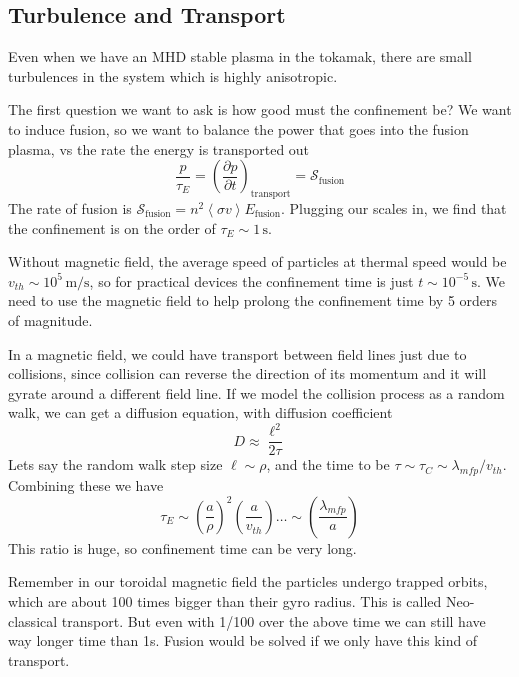 \documentclass[letterpaper, 11pt]{article}
\numberwithin{equation}{section}
\numberwithin{figure}{section}
\begin{document}
\subsection{Turbulence and Transport}

Even when we have an MHD stable plasma in the tokamak, there are small
turbulences in the system which is highly anisotropic.

The first question we want to ask is how good must the confinement be? We want
to induce fusion, so we want to balance the power that goes into the fusion
plasma, vs the rate the energy is transported out
\begin{equation}
  \label{eq:3}
  \frac{p}{\tau_E} = \left( \frac{\partial p}{\partial t} \right)_\mathrm{transport} = \mathcal{S}_\mathrm{fusion}
\end{equation}
The rate of fusion is $\mathcal{S}_\mathrm{fusion} = n^2 \left\langle \sigma v
\right\rangle E_\mathrm{fusion}$. Plugging our scales in, we find that the
confinement is on the order of $\tau_{E} \sim 1\,\mathrm{s}$.

Without magnetic field, the average speed of particles at thermal speed would be
$v_{th}\sim 10^5\,\mathrm{m/s}$, so for practical devices the confinement time
is just $t\sim 10^{-5}\,\mathrm{s}$. We need to use the magnetic field to help
prolong the confinement time by 5 orders of magnitude.

In a magnetic field, we could have transport between field lines just due to
collisions, since collision can reverse the direction of its momentum and it
will gyrate around a different field line. If we model the collision process as a random
walk, we can get a diffusion equation, with diffusion coefficient
\begin{equation}
  \label{eq:27}
  D\approx \frac{\ell^2}{2\tau}
\end{equation}
Lets say the random walk step size $\ell\sim \rho$, and the time to be $\tau
\sim \tau_C \sim \lambda_{mfp}/v_{th}$. Combining these we have
\begin{equation}
  \label{eq:28}
  \tau_E\sim \left( \frac{a}{\rho} \right)^2 \left( \frac{a}{v_{th}} \right)\dots \sim \left( \frac{\lambda_{mfp}}{a} \right)
\end{equation}
This ratio is huge, so confinement time can be very long.

Remember in our toroidal magnetic field the particles undergo trapped orbits,
which are about 100 times bigger than their gyro radius. This is called
Neo-classical transport. But even with 1/100 over the above time we can still
have way longer time than 1s. Fusion would be solved if we only have this kind
of transport.
\end{document}
